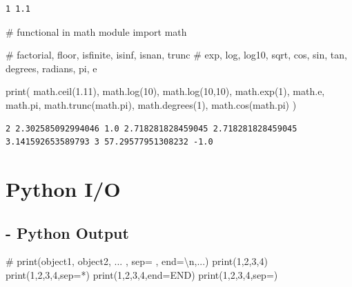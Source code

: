 \documentclass[
  letterpaper,
  DIV=11,
  numbers=noendperiod]{scrreprt}
\newenvironment{Shaded}{\begin{snugshade}}{\end{snugshade}}
\newcommand{\BuiltInTok}[1]{\textcolor[rgb]{0.00,0.23,0.31}{#1}}
\newcommand{\CommentTok}[1]{\textcolor[rgb]{0.37,0.37,0.37}{#1}}
\newcommand{\DecValTok}[1]{\textcolor[rgb]{0.68,0.00,0.00}{#1}}
\newcommand{\FloatTok}[1]{\textcolor[rgb]{0.68,0.00,0.00}{#1}}
\newcommand{\ImportTok}[1]{\textcolor[rgb]{0.00,0.46,0.62}{#1}}
\newcommand{\NormalTok}[1]{\textcolor[rgb]{0.00,0.23,0.31}{#1}}
\newcommand{\OperatorTok}[1]{\textcolor[rgb]{0.37,0.37,0.37}{#1}}
\newcommand{\StringTok}[1]{\textcolor[rgb]{0.13,0.47,0.30}{#1}}
\begin{document}
\begin{verbatim}
1 1.1
\end{verbatim}

\begin{Shaded}
\begin{Highlighting}[]
\CommentTok{\# functional in math module}
\ImportTok{import}\NormalTok{ math}

\CommentTok{\# factorial, floor, isfinite, isinf, isnan, trunc}
\CommentTok{\# exp, log, log10, sqrt, cos, sin, tan, degrees, radians, pi, e}

\BuiltInTok{print}\NormalTok{(}
\NormalTok{math.ceil(}\FloatTok{1.11}\NormalTok{),}
\NormalTok{math.log(}\DecValTok{10}\NormalTok{),}
\NormalTok{math.log(}\DecValTok{10}\NormalTok{,}\DecValTok{10}\NormalTok{),}
\NormalTok{math.exp(}\DecValTok{1}\NormalTok{),}
\NormalTok{math.e,}
\NormalTok{math.pi,}
\NormalTok{math.trunc(math.pi),}
\NormalTok{math.degrees(}\DecValTok{1}\NormalTok{),}
\NormalTok{math.cos(math.pi)}
\NormalTok{)}
\end{Highlighting}
\end{Shaded}

\begin{verbatim}
2 2.302585092994046 1.0 2.718281828459045 2.718281828459045 3.141592653589793 3 57.29577951308232 -1.0
\end{verbatim}

\section{Python I/O}\label{python-io}

\subsection{- Python Output}\label{python-output}

\begin{Shaded}
\begin{Highlighting}[]
\CommentTok{\# print(object1, object2, ... , sep=\textquotesingle{} \textquotesingle{}, end=\textquotesingle{}\textbackslash{}n\textquotesingle{},...)}
\BuiltInTok{print}\NormalTok{(}\DecValTok{1}\NormalTok{,}\DecValTok{2}\NormalTok{,}\DecValTok{3}\NormalTok{,}\DecValTok{4}\NormalTok{)}
\BuiltInTok{print}\NormalTok{(}\DecValTok{1}\NormalTok{,}\DecValTok{2}\NormalTok{,}\DecValTok{3}\NormalTok{,}\DecValTok{4}\NormalTok{,sep}\OperatorTok{=}\StringTok{\textquotesingle{}*\textquotesingle{}}\NormalTok{)}
\BuiltInTok{print}\NormalTok{(}\DecValTok{1}\NormalTok{,}\DecValTok{2}\NormalTok{,}\DecValTok{3}\NormalTok{,}\DecValTok{4}\NormalTok{,end}\OperatorTok{=}\StringTok{\textquotesingle{}END\textquotesingle{}}\NormalTok{)}
\BuiltInTok{print}\NormalTok{(}\DecValTok{1}\NormalTok{,}\DecValTok{2}\NormalTok{,}\DecValTok{3}\NormalTok{,}\DecValTok{4}\NormalTok{,sep}\OperatorTok{=}\StringTok{\textquotesingle{}\textquotesingle{}}\NormalTok{)}
\end{Highlighting}
\end{Shaded}
\end{document}
